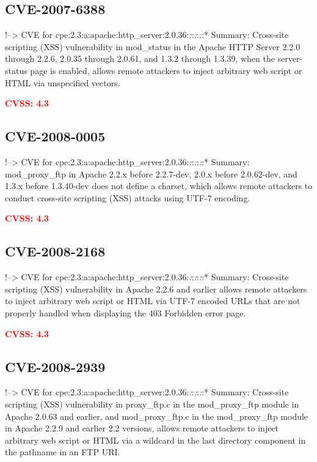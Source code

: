 \documentclass[a4paper, 12pt]{article}
\begin{document}
\hypertarget{cve-2007-6388}{%
\subsection{CVE-2007-6388}\label{cve-2007-6388}}

!--\textgreater{} CVE for
cpe:2.3:a:apache:http\_server:2.0.36:\emph{:}:\emph{:}:\emph{:}:*
Summary: Cross-site scripting (XSS) vulnerability in mod\_status in the
Apache HTTP Server 2.2.0 through 2.2.6, 2.0.35 through 2.0.61, and 1.3.2
through 1.3.39, when the server-status page is enabled, allows remote
attackers to inject arbitrary web script or HTML via unspecified
vectors.

\textbf{\textcolor{red}{CVSS: 4.3}}

\hypertarget{cve-2008-0005}{%
\subsection{CVE-2008-0005}\label{cve-2008-0005}}

!--\textgreater{} CVE for
cpe:2.3:a:apache:http\_server:2.0.36:\emph{:}:\emph{:}:\emph{:}:*
Summary: mod\_proxy\_ftp in Apache 2.2.x before 2.2.7-dev, 2.0.x before
2.0.62-dev, and 1.3.x before 1.3.40-dev does not define a charset, which
allows remote attackers to conduct cross-site scripting (XSS) attacks
using UTF-7 encoding.

\textbf{\textcolor{red}{CVSS: 4.3}}

\hypertarget{cve-2008-2168}{%
\subsection{CVE-2008-2168}\label{cve-2008-2168}}

!--\textgreater{} CVE for
cpe:2.3:a:apache:http\_server:2.0.36:\emph{:}:\emph{:}:\emph{:}:*
Summary: Cross-site scripting (XSS) vulnerability in Apache 2.2.6 and
earlier allows remote attackers to inject arbitrary web script or HTML
via UTF-7 encoded URLs that are not properly handled when displaying the
403 Forbidden error page.

\textbf{\textcolor{red}{CVSS: 4.3}}

\hypertarget{cve-2008-2939}{%
\subsection{CVE-2008-2939}\label{cve-2008-2939}}

!--\textgreater{} CVE for
cpe:2.3:a:apache:http\_server:2.0.36:\emph{:}:\emph{:}:\emph{:}:*
Summary: Cross-site scripting (XSS) vulnerability in proxy\_ftp.c in the
mod\_proxy\_ftp module in Apache 2.0.63 and earlier, and
mod\_proxy\_ftp.c in the mod\_proxy\_ftp module in Apache 2.2.9 and
earlier 2.2 versions, allows remote attackers to inject arbitrary web
script or HTML via a wildcard in the last directory component in the
pathname in an FTP URI.
\end{document}
